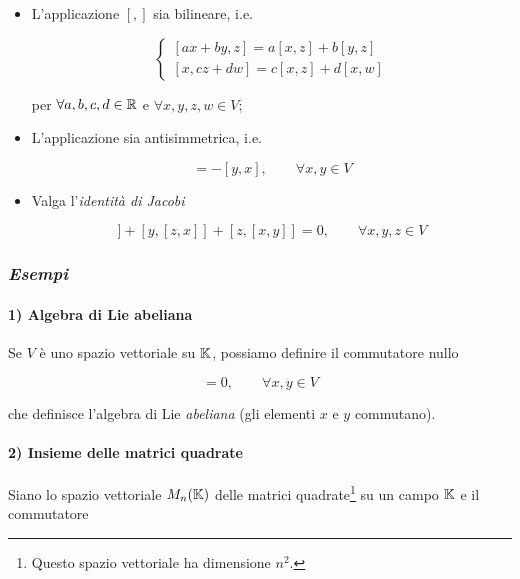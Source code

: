\begin{itemize}
	\item L'applicazione $ [,] $ sia bilineare, i.e.
	
	\begin{equation}
		\begin{cases}
			[ax+by,z] = a[x,z] + b[y,z]\\
			[x,cz+dw] = c[x,z] + d[x,w]
		\end{cases}
	\end{equation}
	
	per $ \forall a,b,c,d \in \mathbb{R} $ e $ \forall x,y,z,w \in V $;
	
	\item L'applicazione sia antisimmetrica, i.e.
	
	\begin{equation}
		[x,y] = -[y,x], \qquad \forall x,y \in V
	\end{equation}
	
	\item Valga l'\textit{identità di Jacobi}
	
	\begin{equation}
		[x,[y,z]] + [y,[z,x]] + [z,[x,y]] = 0, \qquad \forall x,y,z \in V
	\end{equation}
\end{itemize}

\subsubsection{\textit{Esempi}}

\paragraph{1) Algebra di Lie abeliana}

Se $ V $ è uno spazio vettoriale su $ \mathbb{K} $, possiamo definire il commutatore nullo

\begin{equation}
	[x,y] = 0, \qquad \forall x,y \in V
\end{equation}

che definisce l'algebra di Lie \textit{abeliana} (gli elementi $ x $ e $ y $ commutano).

\paragraph{2) Insieme delle matrici quadrate}

Siano lo spazio vettoriale $ M_{n}(\mathbb{K}) $ delle matrici quadrate\footnote{%
	Questo spazio vettoriale ha dimensione $ n^{2} $.%
} su un campo $ \mathbb{K} $ e il commutatore

